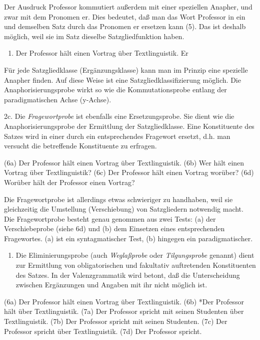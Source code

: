 \documentclass[
]{article}
\providecommand{\tightlist}{%
  \setlength{\itemsep}{0pt}\setlength{\parskip}{0pt}}
\begin{document}
Der Ausdruck Professor kommutiert außerdem mit einer speziellen Anapher, und zwar mit dem Pronomen er. Dies bedeutet, daß man das Wort Professor in ein und demselben Satz durch das Pronomen er ersetzen kann (5). Das ist deshalb möglich, weil sie im Satz dieselbe Satzgliedfunktion haben.

\begin{enumerate}
\def\labelenumi{(\arabic{enumi})}
\setcounter{enumi}{4}
\tightlist
\item
  Der Professor hält einen Vortrag über Textlinguistik.
  Er
\end{enumerate}

Für jede Satzgliedklasse (Ergänzungsklasse) kann man im Prinzip eine spezielle Anapher finden. Auf diese Weise ist eine Satzgliedklassifizierung möglich. Die Anaphorisierungsprobe wirkt so wie die Kommutationsprobe entlang der paradigmatischen Achse (y-Achse).

2c. Die \emph{Fragewortprobe} ist ebenfalls eine Ersetzungsprobe. Sie dient wie die Anaphorisierungsprobe der Ermittlung der Satzgliedklasse. Eine Konstituente des Satzes wird in einer durch ein entsprechendes Fragewort ersetzt, d.h. man versucht die betreffende Konstituente zu erfragen.

(6a) Der Professor hält einen Vortrag über Textlinguistik.
(6b) Wer hält einen Vortrag über Textlinguistik?
(6c) Der Professor hält einen Vortrag worüber?
(6d) Worüber hält der Professor einen Vortrag?

Die Fragewortprobe ist allerdings etwas schwieriger zu handhaben, weil sie gleichzeitig die Umstellung (Verschiebung) von Satzgliedern notwendig macht. Die Fragewortprobe besteht genau genommen aus zwei Tests: (a) der Verschiebeprobe (siehe 6d) und (b) dem Einsetzen eines entsprechenden Fragewortes. (a) ist ein syntagmatischer Test, (b) hingegen ein paradigmatischer.

\begin{enumerate}
\def\labelenumi{\arabic{enumi}.}
\setcounter{enumi}{2}
\tightlist
\item
  Die Eliminierungsprobe (auch \emph{Weglaßprobe} oder \emph{Tilgungsprobe} genannt) dient zur Ermittlung von obligatorischen und fakultativ auftretenden Konstituenten des Satzes. In der Valenzgrammatik wird betont, daß die Unterscheidung zwischen Ergänzungen und Angaben mit ihr nicht möglich ist.
\end{enumerate}

(6a) Der Professor hält einen Vortrag über Textlinguistik.
(6b) *Der Professor hält über Textlinguistik.
(7a) Der Professor spricht mit seinen Studenten über Textlinguistik.
(7b) Der Professor spricht mit seinen Studenten.
(7c) Der Professor spricht über Textlinguistik.
(7d) Der Professor spricht.
\end{document}

